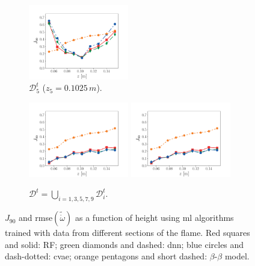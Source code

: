 \documentclass[review]{elsarticle}
\newcommand{\wt}[1]{\widetilde{#1}}
\begin{document}
\begin{figure}[!tbp]
\begin{subfigure}[t]{\textwidth}
    \includegraphics[page=2,width=0.48\textwidth, trim=0.2cm 0cm 1cm 1cm, clip=true]{./figs/dice_predictions_0006.pdf}%
    \caption{$\mathcal{D}_5^t$ ($z_5=0.1025\,\unit{m}$).}\label{fig:gen_5}%
  \end{subfigure}\hfill%
  \begin{subfigure}[t]{\textwidth}%
    \includegraphics[page=1,width=0.48\textwidth, trim=0.2cm 0cm 1cm 1cm, clip=true]{./figs/dice_predictions_skip.pdf}\hfill%
    \includegraphics[page=2,width=0.48\textwidth, trim=0.2cm 0cm 1cm 1cm, clip=true]{./figs/dice_predictions_skip.pdf}%
    \caption{$\mathcal{D}^t = \bigcup\limits_{i=1, 3, 5, 7, 9} \mathcal{D}_i^t$.}\label{fig:gen_skip}%
  \end{subfigure}%
  \caption{$J_{90}$ and \gls{rmse}$(\wt{\dot{\omega}})$ as a function of
    height using \gls{ml} algorithms trained with data from different
    sections of the flame. Red squares and solid: RF; green diamonds
    and dashed: \gls{dnn}; blue circles and dash-dotted: \gls{cvae}; orange
    pentagons and short dashed: $\beta$-$\beta$ model.}\label{fig:gen}%
\end{figure}%
\end{document}
